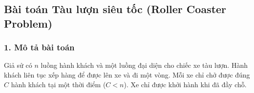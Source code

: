 











\subsection{Bài toán Tàu lượn siêu tốc (Roller Coaster Problem)}

\subsubsection*{1. Mô tả bài toán}

Giả sử có $n$ luồng hành khách và một luồng đại diện cho chiếc xe tàu lượn. Hành khách liên tục xếp hàng để được lên xe và đi một vòng. Mỗi xe chỉ chở được đúng $C$ hành khách tại một thời điểm ($C < n$). Xe chỉ được khởi hành khi đã đầy chỗ.

